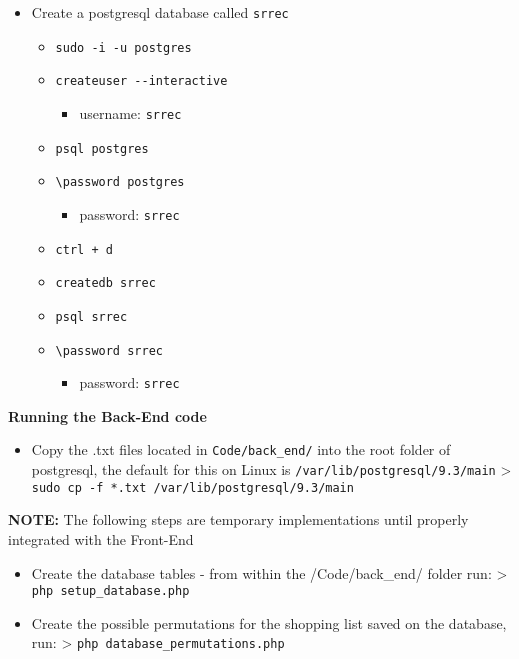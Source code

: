 \documentclass[10pt, a4paper, onecolumn]{scrartcl}
\begin{document}
	\begin{itemize}[noitemsep]
		\item
		Create a postgresql database called \texttt{srrec}
		
		\begin{itemize}[noitemsep]
			\item
			\texttt{sudo\ -i\ -u\ postgres}
			\item
			\texttt{createuser\ -\/-interactive}
			
			\begin{itemize}[noitemsep]
				\item
				username: \texttt{srrec}
			\end{itemize}
			\item
			\texttt{psql\ postgres}
			\item
			\texttt{\textbackslash{}password\ postgres}
			
			\begin{itemize}[noitemsep]
				\item
				password: \texttt{srrec}
			\end{itemize}
			\item
			\texttt{ctrl\ +\ d}
			\item
			\texttt{createdb\ srrec}
			\item
			\texttt{psql\ srrec}
			\item
			\texttt{\textbackslash{}password\ srrec}
			
			\begin{itemize}[noitemsep]
				\item
				password: \texttt{srrec}
			\end{itemize}
		\end{itemize}
	\end{itemize}
	
	\textbf{Running the Back-End code} 
	
		\begin{itemize}[noitemsep]
			\item 	Copy the .txt files located in \texttt{Code/back\_end/} into the root
			folder of postgresql, the default for this on Linux is
			\texttt{/var/lib/postgresql/9.3/main} \textgreater{}
			\texttt{sudo\ cp\ -f\ *.txt\ /var/lib/postgresql/9.3/main}
		\end{itemize}
	
	\textbf{NOTE:} The following steps are temporary implementations until
	properly integrated with the Front-End 
	
		\begin{itemize}[noitemsep]
			\item 	Create the database tables - from within the /Code/back\_end/ folder
			run: \textgreater{} \texttt{php\ setup\_database.php}
			\item 	Create the possible permutations for the shopping list saved on the
			database, run: \textgreater{} \texttt{php\ database\_permutations.php}
		\end{itemize}
	
\end{document}
